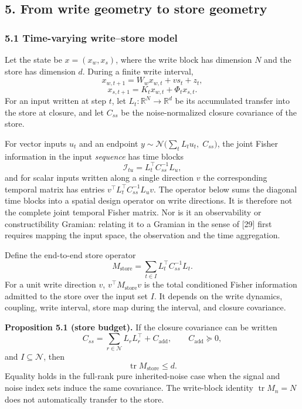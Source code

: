 \documentclass[
  10pt,
]{article}
\begin{document}
\subsection{5. From write geometry to store
geometry}\label{from-write-geometry-to-store-geometry}

\subsubsection{5.1 Time-varying write--store
model}\label{time-varying-writestore-model}

Let the state be \(x=(x_w,x_s)\), where the write block has dimension
\(N\) and the store has dimension \(d\). During a finite write interval,
\[
x_{w,t+1}=W_wx_{w,t}+v s_t+z_t,
\] \[
x_{s,t+1}=K_tx_{w,t}+\Phi_tx_{s,t}.
\] For an input written at step \(t\), let
\(L_t:\mathbb R^N\to\mathbb R^d\) be its accumulated transfer into the
store at closure, and let \(C_{ss}\) be the noise-normalized closure
covariance of the store.

For vector inputs \(u_t\) and an endpoint
\(y\sim\mathcal N\bigl(\sum_tL_tu_t,\;C_{ss}\bigr)\), the joint Fisher
information in the input \emph{sequence} has time blocks \[
\mathcal I_{tu}=L_t^\top C_{ss}^{-1}L_u ,
\] and for scalar inputs written along a single direction \(v\) the
corresponding temporal matrix has entries
\(v^\top L_t^\top C_{ss}^{-1}L_uv\). The operator below sums the
diagonal time blocks into a spatial design operator on write directions.
It is therefore not the complete joint temporal Fisher matrix. Nor is it
an observability or constructibility Gramian: relating it to a Gramian
in the sense of {[}29{]} first requires mapping the input space, the
observation and the time aggregation.

Define the end-to-end store operator \[
\boxed{
M_{\mathrm{store}}=\sum_{t\in I}L_t^\top C_{ss}^{-1}L_t.
}
\] For a unit write direction \(v\), \(v^\top M_{\mathrm{store}}v\) is
the total conditioned Fisher information admitted to the store over the
input set \(I\). It depends on the write dynamics, coupling, write
interval, store map during the interval, and closure covariance.

\textbf{Proposition 5.1 (store budget).} If the closure covariance can
be written \[
C_{ss}=\sum_{r\in\mathcal N}L_rL_r^\top+C_{\mathrm{add}},\qquad C_{\mathrm{add}}\succeq0,
\] and \(I\subseteq\mathcal N\), then \[
\boxed{\operatorname{tr}M_{\mathrm{store}}\le d.}
\] Equality holds in the full-rank pure inherited-noise case when the
signal and noise index sets induce the same covariance. The write-block
identity \(\operatorname{tr}M_n=N\) does not automatically transfer to
the store.
\end{document}
